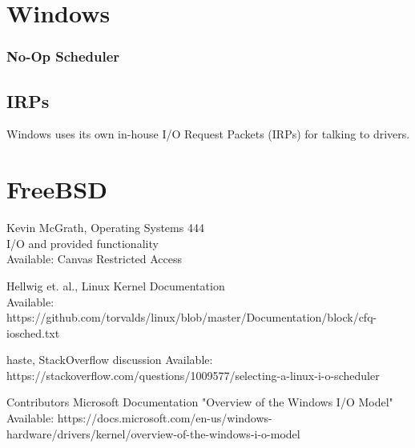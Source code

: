 \documentclass[letterpaper,10pt,notitlepage,fleqn]{article}
\begin{document}
\section{Windows}
\subsubsection{No-Op Scheduler}

\subsection{IRPs}

Windows uses its own in-house I/O Request Packets (IRPs) for talking to drivers. 




\section{FreeBSD}






\begin{thebibliography}{20}


    
    Kevin McGrath, Operating Systems 444 \\
    I/O and provided functionality \\
    Available: Canvas Restricted Access

    Hellwig et. al., Linux Kernel Documentation \\
    Available: https://github.com/torvalds/linux/blob/master/Documentation/block/cfq-iosched.txt

    haste, StackOverflow discussion
    Available: https://stackoverflow.com/questions/1009577/selecting-a-linux-i-o-scheduler



    Contributors Microsoft Documentation "Overview of the Windows I/O Model"
    Available: https://docs.microsoft.com/en-us/windows-hardware/drivers/kernel/overview-of-the-windows-i-o-model







\end{thebibliography}

        
\end{document}
